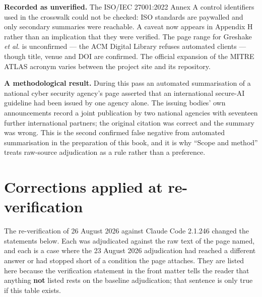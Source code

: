 \documentclass[11pt,a4paper,twoside,openany]{book}
\begin{document}
\textbf{Recorded as unverified.} The ISO/IEC 27001:2022 Annex A control identifiers used in the crosswalk could not be checked: ISO standards are paywalled and only secondary summaries were reachable. A caveat now appears in Appendix H rather than an implication that they were verified. The page range for Greshake \emph{et al.} is unconfirmed — the ACM Digital Library refuses automated clients — though title, venue and DOI are confirmed. The official expansion of the MITRE ATLAS acronym varies between the project site and its repository.


\textbf{A methodological result.} During this pass an automated summarisation of a national cyber security agency's page asserted that an international secure-AI guideline had been issued by one agency alone. The issuing bodies' own announcements record a joint publication by two national agencies with seventeen further international partners; the original citation was correct and the summary was wrong. This is the second confirmed false negative from automated summarisation in the preparation of this book, and it is why “Scope and method” treats raw-source adjudication as a rule rather than a preference.


\FloatBarrier
\section*{Corrections applied at re-verification}

The re-verification of 26 August 2026 against Claude Code 2.1.246 changed the statements below. Each was adjudicated against the raw text of the page named, and each is a case where the 23 August 2026 adjudication had reached a different answer or had stopped short of a condition the page attaches. They are listed here because the verification statement in the front matter tells the reader that anything \textbf{not} listed rests on the baseline adjudication; that sentence is only true if this table exists.
\end{document}
